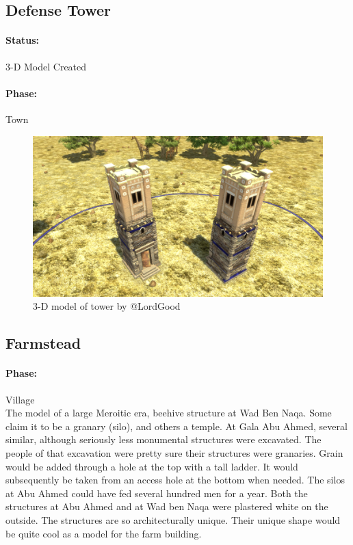 \documentclass[a4paper,12pt]{scrreprt}
\begin{document}
\subsection{Defense Tower}

\paragraph{Status:} 3-D Model Created\\
\paragraph{Phase:} Town\\


\begin{figure}[H]
	\centering
	\includegraphics[width=\textwidth]{img/tower/tower}
	\caption{3-D model of tower by @LordGood}
\end{figure}

\subsection{Farmstead}

\paragraph{Phase:} Village\\

The model of a large Meroitic era, beehive structure at Wad Ben Naqa. Some claim it to be a granary (silo), and others a temple. At Gala Abu Ahmed, several similar, although seriously less monumental structures were excavated. The people of that excavation were pretty sure their structures were granaries. Grain would be added through a hole at the top with a tall ladder. It would subsequently be taken from an access hole at the bottom when needed. The silos at Abu Ahmed could have fed several hundred men for a year. Both the structures at Abu Ahmed and at Wad ben Naqa were plastered white on the outside. The structures are so architecturally unique. Their unique shape would be quite cool as a model for the farm building.
\end{document}
